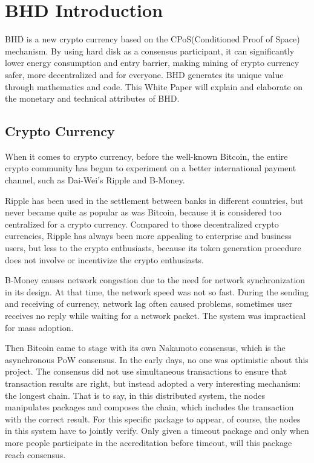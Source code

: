 \chapter{BHD Introduction}
BHD is a new crypto currency based on the CPoS(Conditioned Proof of Space) mechanism. By using hard disk as a consensus participant, it can significantly lower energy consumption and entry barrier, making mining of crypto currency safer, more decentralized and for everyone. BHD generates its unique value through mathematics and code. This White Paper will explain and elaborate on the monetary and technical attributes of BHD.
\section{Crypto Currency}
\begin{flushleft}
    When it comes to crypto currency, before the well-known Bitcoin, the entire crypto community has begun to experiment on a better international payment channel, such as Dai-Wei's Ripple and B-Money.
\end{flushleft}
\begin{flushleft}
    Ripple has been used in the settlement between banks in different countries, but never became quite as popular as was Bitcoin, because it is considered too centralized for a crypto currency. Compared to those decentralized crypto currencies, Ripple has always been more appealing to enterprise and business users, but less to the crypto enthusiasts, because its token generation procedure does not involve or incentivize the crypto enthusiasts.
\end{flushleft}
\begin{flushleft}
    B-Money causes network congestion due to the need for network synchronization in its design. At that time, the network speed was not so fast. During the sending and receiving of currency, network lag often caused problems, sometimes user receives no reply while waiting for a network packet. The system was impractical for mass adoption.
\end{flushleft}
\begin{flushleft}
    Then Bitcoin came to stage with its own Nakamoto consensus, which is the asynchronous PoW consensus. In the early days, no one was optimistic about this project. The consensus did not use simultaneous transactions to ensure that transaction results are right, but instead adopted a very interesting mechanism: the longest chain. That is to say, in this distributed system, the nodes manipulates packages and composes the chain, which includes the transaction with the correct result. For this specific package to appear, of course, the nodes in this system have to jointly verify. Only given a timeout package and only when more people participate in the accreditation before timeout, will this package reach consensus.
\end{flushleft}
